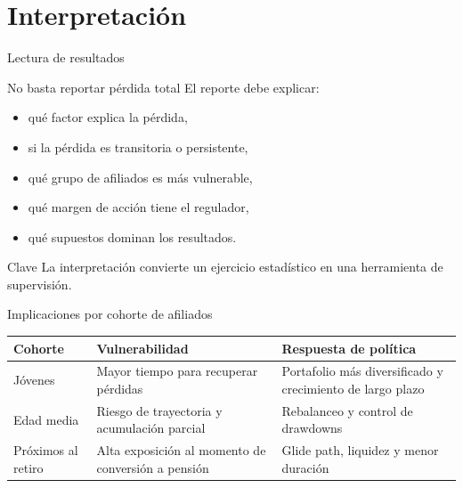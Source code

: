 \documentclass[aspectratio=169,11pt]{beamer}
\begin{document}
\section{Interpretación}

\begin{frame}{Lectura de resultados}
\begin{block}{No basta reportar pérdida total}
El reporte debe explicar:
\begin{itemize}
  \item qué factor explica la pérdida,
  \item si la pérdida es transitoria o persistente,
  \item qué grupo de afiliados es más vulnerable,
  \item qué margen de acción tiene el regulador,
  \item qué supuestos dominan los resultados.
\end{itemize}
\end{block}

\begin{alertblock}{Clave}
La interpretación convierte un ejercicio estadístico en una herramienta de supervisión.
\end{alertblock}
\end{frame}

\begin{frame}{Implicaciones por cohorte de afiliados}
\begin{table}
\centering
\small
\begin{tabular}{p{} p{} p{}}
\toprule
\textbf{Cohorte} & \textbf{Vulnerabilidad} & \textbf{Respuesta de política} \\
\midrule
Jóvenes & Mayor tiempo para recuperar pérdidas & Portafolio más diversificado y crecimiento de largo plazo \\
Edad media & Riesgo de trayectoria y acumulación parcial & Rebalanceo y control de drawdowns \\
Próximos al retiro & Alta exposición al momento de conversión a pensión & Glide path, liquidez y menor duración \\
\bottomrule
\end{tabular}
\end{table}
\end{frame}
\end{document}
